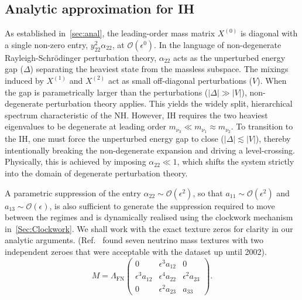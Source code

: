 \documentclass[11pt,letterpaper]{article}
\begin{document}
\subsection{Analytic approximation for IH} \label{sec:IH}
As established in~\cref{sec:anal}, the leading-order mass matrix $X^{(0)}$ is diagonal with a single non-zero entry, $y_{22}^2 \alpha_{22}$, at $\mathcal{O}(\epsilon^0)$. In the language of non-degenerate Rayleigh-Schr\"odinger perturbation theory, $\alpha_{22}$ acts as the unperturbed energy gap ($\Delta$) separating the heaviest state from the massless subspace. The mixings induced by $X^{(1)}$ and $X^{(2)}$ act as small off-diagonal perturbations ($V$). When the gap is parametrically larger than the perturbations ($|\Delta| \gg |V|$), non-degenerate perturbation theory applies. This yields the widely split, hierarchical spectrum characteristic of the NH\@. However, IH requires the two heaviest eigenvalues to be degenerate at leading order $m_{\nu_3} \ll m_{\nu_1} \approx m_{\nu_2} $. To transition to the IH, one must force the unperturbed energy gap to close ($|\Delta| \lesssim |V|$), thereby intentionally breaking the non-degenerate expansion and driving a level-crossing. Physically, this is achieved by imposing $\alpha_{22} \ll 1$, which shifts the system strictly into the domain of degenerate perturbation theory.

A parametric suppression of the entry $\alpha_{22} \sim
\mathcal{O}(\epsilon^2)$, so that $a_{11} \sim \mathcal{O}(\epsilon^2)$ and
$a_{13} \sim \mathcal{O}(\epsilon)$, is also sufficient to generate the
suppression required to move between the regimes and is dynamically realised
using the clockwork mechanism in~\cref{Sec:Clockwork}. We shall work with the
exact texture zeros for clarity in our analytic arguments.
(Ref.~\cite{Frampton:2002yf} found seven neutrino mass textures with
two independent zeroes that were acceptable with the dataset up until 2002).  
\begin{equation} \label{eqn:IOtexture}
    M = \Lambda_{\text{FN}}
    \begin{pmatrix}
    0&\epsilon^{3}a_{12}&0\\
    
    \epsilon^{3} a_{12} & \epsilon^{4} a_{22}& \epsilon^{2} a_{23}\\
    
    0 & \epsilon^{2}a_{23}&a_{33} 
    \end{pmatrix}.
\end{equation}
\end{document}
